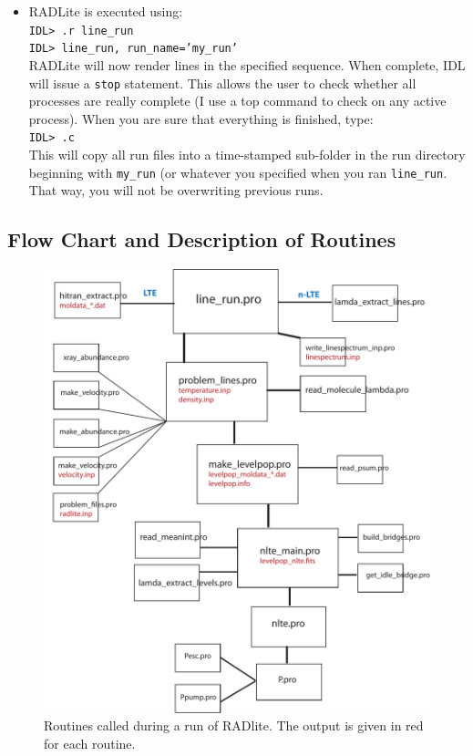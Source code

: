 \documentclass[11pt]{article}
\begin{document}
\begin{itemize}
\item RADLite is executed using: \\
{\tt IDL> .r line\_run}\\
{\tt IDL> line\_run, run\_name='my\_run'}\\

RADLite will now render lines in the specified sequence. When complete, IDL will issue a {\tt stop} statement. This allows the user to check
whether all processes are really complete (I use a top command to check on any active process). When you are sure that everything
is finished, type:\\
{\tt IDL> .c }\\

This will copy all run files into a time-stamped sub-folder in the run directory beginning with {\tt my\_run} (or whatever you specified when
you ran {\tt line\_run}. That way, you will not be overwriting previous runs. 

\end{itemize}

\subsection{Flow Chart and Description of Routines}

\begin{figure}
\centering
\includegraphics[scale=0.6]{RADLite_flowchart_2012.pdf}
\caption{Routines called during a run of RADlite.  The output is given in red for each routine.}
\end{figure}
\end{document}
